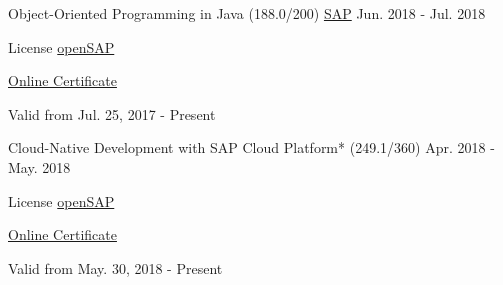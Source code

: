 

\begin{cventries}

  \cventry
    {Object-Oriented Programming in Java (188.0/200)} %
    {\href{https://www.sap.com/index.html}{SAP}} %
    {} %
    {Jun. 2018 - Jul. 2018} %
    {
	    \begin{cvitems} %
        \item {License \href{https://open.sap.com/}{openSAP}} %
        \item {\href{https://open.sap.com/verify/xocis-tyvip-gynuh-byneg-punel}{Online Certificate}} %
        \item {Valid from Jul. 25, 2017 - Present} %
      \end{cvitems}
    }   
    
  \cventry
    {Cloud-Native Development with SAP Cloud Platform* (249.1/360)} %
    {} %
    {} %
    {Apr. 2018 - May. 2018} %
    {
	    \begin{cvitems} %
        \item {License \href{https://open.sap.com/}{openSAP}} %
        \item {\href{https://open.sap.com/verify/xosen-nykel-vybup-susig-sihim}{Online Certificate}} %
        \item {Valid from May. 30, 2018 - Present} %
      \end{cvitems}
    }   


\end{cventries}
